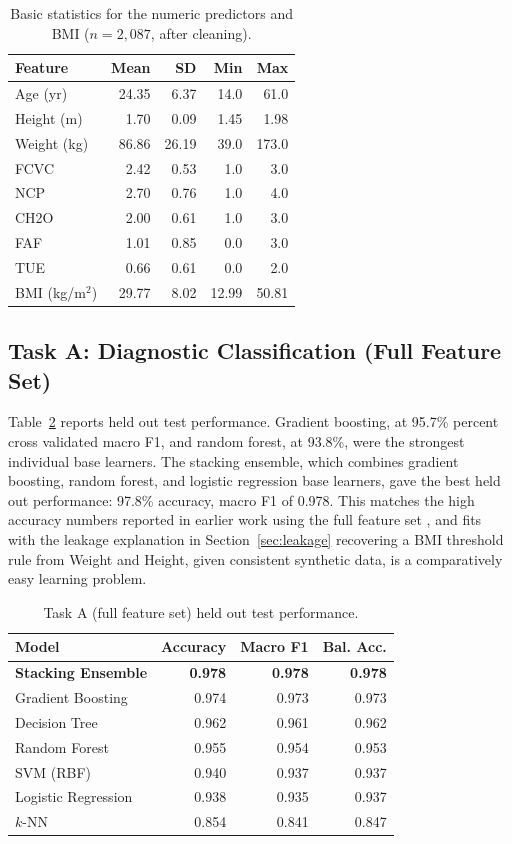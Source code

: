 \documentclass[journal]{IEEEtran}
\begin{document}
\begin{table}[t]
\centering
\caption{Basic statistics for the numeric predictors and BMI ($n=2{,}087$, after cleaning).}
\label{tab:desc}
\begin{tabular}{lrrrr}
\toprule
Feature & Mean & SD & Min & Max \\
\midrule
Age (yr) & 24.35 & 6.37 & 14.0 & 61.0 \\
Height (m) & 1.70 & 0.09 & 1.45 & 1.98 \\
Weight (kg) & 86.86 & 26.19 & 39.0 & 173.0 \\
FCVC & 2.42 & 0.53 & 1.0 & 3.0 \\
NCP & 2.70 & 0.76 & 1.0 & 4.0 \\
CH2O & 2.00 & 0.61 & 1.0 & 3.0 \\
FAF & 1.01 & 0.85 & 0.0 & 3.0 \\
TUE & 0.66 & 0.61 & 0.0 & 2.0 \\
BMI (kg/m$^2$) & 29.77 & 8.02 & 12.99 & 50.81 \\
\bottomrule
\end{tabular}
\end{table}

\subsection{Task A: Diagnostic Classification (Full Feature Set)}
\label{sec:results-taskA}
Table~\ref{tab:clfA} reports held out test performance. Gradient boosting, at 95.7\% percent cross validated macro F1, and random forest, at 93.8\%, were the strongest individual base learners. The stacking ensemble, which combines gradient boosting, random forest, and logistic regression base learners, gave the best held out performance: 97.8\% accuracy, macro F1 of 0.978. This matches the high accuracy numbers reported in earlier work using the full feature set \cite{benchmarking2025shap, ratih2019estimation, delahoz2019obesity}, and fits with the leakage explanation in Section~\ref{sec:leakage} recovering a BMI threshold rule from Weight and Height, given consistent synthetic data, is a comparatively easy learning problem.

\begin{table}[t]
\centering
\caption{Task A (full feature set) held out test performance.}
\label{tab:clfA}
\begin{tabular}{lrrr}
\toprule
Model & Accuracy & Macro F1 & Bal. Acc. \\
\midrule
\textbf{Stacking Ensemble} & \textbf{0.978} & \textbf{0.978} & \textbf{0.978} \\
Gradient Boosting & 0.974 & 0.973 & 0.973 \\
Decision Tree & 0.962 & 0.961 & 0.962 \\
Random Forest & 0.955 & 0.954 & 0.953 \\
SVM (RBF) & 0.940 & 0.937 & 0.937 \\
Logistic Regression & 0.938 & 0.935 & 0.937 \\
$k$-NN & 0.854 & 0.841 & 0.847 \\
\bottomrule
\end{tabular}
\end{table}
\end{document}
